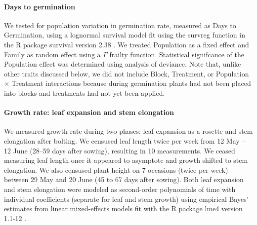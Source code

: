 \documentclass[11pt, oneside]{article}
\newcommand{\pkg}[1]{{\fontseries{b}\selectfont #1}}
\begin{document}
\paragraph{Days to germination} We tested for population variation in germination rate, measured as Days to Germination, using a lognormal survival model fit using the survreg function in the R package \pkg{survival} version 2.38 \citep{Therneau_2015}. We treated Population as a fixed effect and Family as random effect using a $\Gamma$ frailty function. Statistical signifcance of the Population effect was determined using analysis of deviance. Note that, unlike other traits discussed below, we did not include Block, Treatment, or Population $\times$ Treatment interactions because during germination plants had not been placed into blocks and treatments had not yet been applied.


\paragraph{Growth rate: leaf expansion and stem elongation}

We measured growth rate during two phases: leaf expansion as a rosette and stem elongation after bolting. We censused leaf length twice per week from 12 May -- 12 June (28--59 days after sowing), resulting in 10 measurements. We ceased measuring leaf length once it appeared to asymptote and growth shifted to stem elongation.  We also censused plant height on 7 occasions (twice per week) between 29 May and 20 June (45 to 67 days after sowing). Both leaf expansion and stem elongation were modeled as second-order polynomials of time with individual coefficients (separate for leaf and stem growth) using empirical Bayes' estimates from linear mixed-effects models fit with the R package \pkg{lme4} version 1.1-12 \citep{Bates_etal_2015}.
\end{document}
